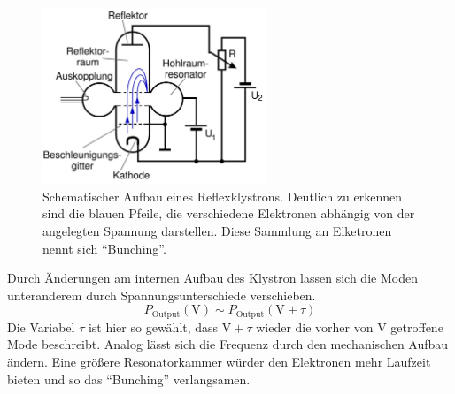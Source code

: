 \begin{figure}
    \centering
    \includegraphics[width=0.6\textwidth]{bilder/theo.JPG}
    \caption{Schematischer Aufbau eines Reflexklystrons. Deutlich zu erkennen sind die blauen Pfeile, die verschiedene Elektronen abhängig von der angelegten Spannung darstellen. 
    Diese Sammlung an Elketronen nennt sich \enquote{Bunching}.} 
    \label{fig:ref}
\end{figure}
Durch Änderungen am internen Aufbau des Klystron lassen sich die Moden unteranderem durch Spannungsunterschiede verschieben. 
\begin{equation}
    P_{\text{Output}} (\si{\volt}) \sim P_{\text{Output}} (\si{\volt} + \tau)
\end{equation}
Die Variabel $\tau$ ist hier so gewählt, dass $\si{\volt} + \tau$ wieder die vorher von $\si{\volt}$ getroffene Mode beschreibt.
Analog lässt sich die Frequenz durch den mechanischen Aufbau ändern. Eine größere Resonatorkammer würder den Elektronen 
mehr Laufzeit bieten und so das \enquote{Bunching} verlangsamen.
